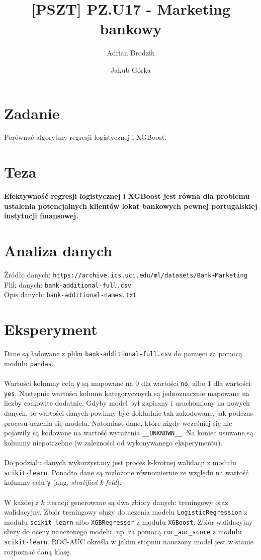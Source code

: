 \documentclass[12pt,a4paper]{article}
\begin{document}
\title{[PSZT] PZ.U17 - Marketing bankowy}
\author{Adrian Brodzik \and Jakub Górka}
\maketitle

\section*{Zadanie}
Porównać algorytmy regresji logistycznej i XGBoost.

\section*{Teza}
\textbf{Efektywność regresji logistycznej i XGBoost jest równa dla problemu ustalenia potencjalnych klientów lokat bankowych pewnej portugalskiej instytucji finansowej.}

\section*{Analiza danych}
Źródło danych: \texttt{https://archive.ics.uci.edu/ml/datasets/Bank+Marketing}
\\
Plik danych: \texttt{bank-additional-full.csv}
\\
Opis danych: \texttt{bank-additional-names.txt}

\section*{Eksperyment}
Dane są ładowane z pliku \texttt{bank-additional-full.csv} do pamięci za pomocą modułu \texttt{pandas}.
\\
\\
Wartości kolumny celu \texttt{y} są mapowane na $0$ dla wartości \texttt{no}, albo $1$ dla wartości \texttt{yes}. Następnie wartości kolumn kategorycznych są jednoznacznie mapowane na liczby całkowite dodatnie. Gdyby model był zapisany i uruchomiony na nowych danych, to wartości danych powinny być dokładnie tak zakodowane, jak podczas procesu uczenia się modelu. Natomiast dane, które nigdy wcześniej się nie pojawiły są kodowane na wartość wyrażenia \texttt{\_\_UNKNOWN\_\_}. Na koniec usuwane są kolumny niepotrzebne (w zależności od wykonywanego eksperymentu).
\\
\\
Do podziału danych wykorzystany jest proces k-krotnej walidacji z modułu \texttt{scikit-learn}. Ponadto dane są rozłożone równomiernie ze względu na wartość kolumny celu \texttt{y} (ang. \textit{stratified k-fold}).
\\
\\
W każdej z $k$ iteracji generowane są dwa zbiory danych: treningowy oraz walidacyjny. Zbiór treningowy służy do uczenia modelu \texttt{LogisticRegression} z modułu \texttt{scikit-learn} albo \texttt{XGBRegressor} z modułu \texttt{XGBoost}. Zbiór walidacyjny służy do oceny nauczonego modelu, np. za pomocą \texttt{roc\_auc\_score} z modułu \texttt{scikit-learn}. ROC-AUC określa w jakim stopniu nauczony model jest w stanie rozpoznać daną klasę.
\end{document}
